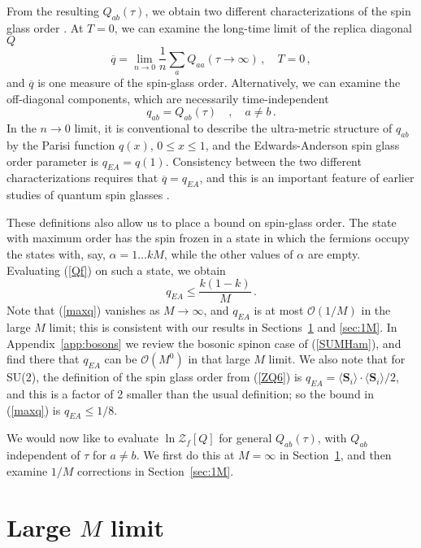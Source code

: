 \documentclass[aps,prx,preprint,onecolumn,citeautoscript,superscriptaddress,nofootinbib,
eqsecnum]{revtex4}
\newcommand{\beq}{\begin{equation}}
\newcommand{\eeq}{\end{equation}}
\begin{document}
From the resulting $Q_{ab} (\tau)$, we obtain two different characterizations of the spin glass order \cite{YSR93,RSY95,GPS00,GPS01,Cugliandolo00,Anous:2021eqj}. At $T=0$, we can examine the long-time limit of the replica diagonal $Q$
\beq
\overline{q} = \lim_{n \rightarrow 0} \frac{1}{n} \sum_a Q_{aa} (\tau \rightarrow \infty)\,, \quad T=0\,,
\label{eq:qbarDef}
\eeq
and $\overline{q}$ is one measure of the spin-glass order. Alternatively, we can examine the off-diagonal components, which are necessarily time-independent
\beq
q_{ab} = Q_{ab} (\tau) \quad, \quad a \neq b\,.
\label{eq:qabDef}
\eeq
In the $n \rightarrow 0$ limit, it is conventional to describe the ultra-metric structure of $q_{ab}$ by the Parisi function $q(x)$, $0 \leq x \leq 1$, and the Edwards-Anderson spin glass order parameter is $q_{EA} = q(1)$. Consistency between the two different characterizations requires that $\overline{q} = q_{EA}$, and this is an important feature of earlier studies of quantum spin glasses \cite{RSY95}. 

These definitions also allow us to place a bound on spin-glass order. The state with maximum order has the spin frozen in a state in which the fermions occupy the states with, say, $\alpha = 1 \ldots k M$, while the other values of $\alpha$ are empty. Evaluating (\ref{Qf}) on such a state, we obtain
\beq
q_{EA} \leq \frac{k(1-k)}{M}\,. \label{maxq}
\eeq
Note that (\ref{maxq}) vanishes as $M \rightarrow \infty$, and $q_{EA}$ is at most $\mathcal{O}(1/M)$ in the large $M$ limit; this is consistent with our results in Sections~\ref{sec:largeM} and \ref{sec:1M}. In Appendix~\ref{app:bosons} we review the bosonic spinon case of (\ref{SUMHam}), and find there that $q_{EA}$ can be $\mathcal{O}(M^0)$ in that large $M$ limit. We also note that for SU(2), the definition of the spin glass order from (\ref{ZQ6}) is $q_{EA} = \langle {\bm S}_i \rangle \cdot \langle {\bm S}_i \rangle/2$, and this is a factor of 2 smaller than the usual definition; so the bound in (\ref{maxq}) is $q_{EA} \leq 1/8$.

We would now like to evaluate $\ln \mathcal{Z}_f [Q]$ for general $Q_{ab} (\tau)$, with $Q_{ab}$ independent of $\tau$ for $a \neq b$.
We first do this at $M = \infty$ in Section~\ref{sec:largeM}, and then examine $1/M$ corrections in Section~\ref{sec:1M}.

\section{Large $M$ limit}
\label{sec:largeM}
\end{document}
